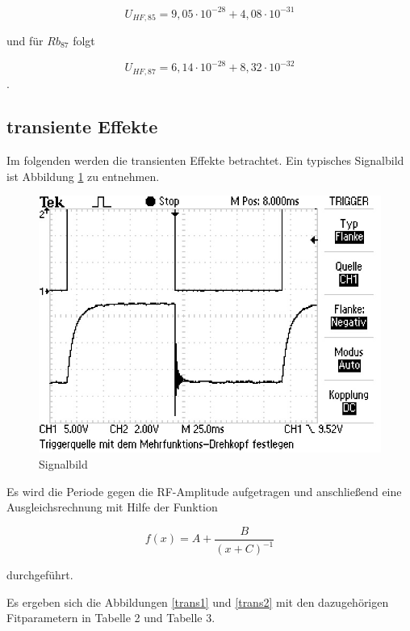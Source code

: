 \begin{equation}
U_{HF,85} = 9,05 \cdot 10^{-28} + 4,08 \cdot 10^{-31}
\end{equation}

und für $Rb_{87}$ folgt

\begin{equation}
U_{HF,87} = 6,14 \cdot 10^{-28} + 8,32 \cdot 10^{-32}
\end{equation}
.

\subsection{transiente Effekte}
Im folgenden werden die transienten Effekte betrachtet. Ein typisches Signalbild ist Abbildung \ref{sigPic} zu entnehmen.

\begin{figure}[h]
\centering
\includegraphics[scale=0.8]{img/TEK0019.JPG}
\caption{Signalbild}
\label{sigPic}
\end{figure}

Es wird die Periode gegen die RF-Amplitude aufgetragen und anschließend eine Ausgleichsrechnung mit Hilfe der Funktion

\begin{equation}
f(x) = A + \frac{B}{(x+C)^{-1}}
\end{equation}

durchgeführt.

Es ergeben sich die Abbildungen \ref{trans1} und \ref{trans2} mit den dazugehörigen Fitparametern in Tabelle 2 und Tabelle 3.

